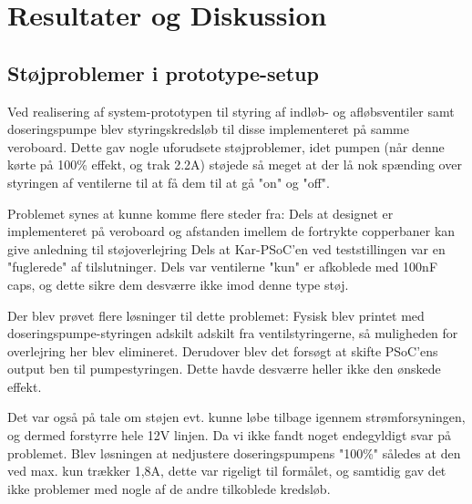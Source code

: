 \section{Resultater og Diskussion}

\subsection{Støjproblemer i prototype-setup}

Ved realisering af system-prototypen til styring af indløb- og afløbsventiler samt doseringspumpe blev styringskredsløb til disse implementeret på samme veroboard. 
Dette gav nogle uforudsete støjproblemer, idet pumpen (når denne kørte på 100\% effekt, og trak 2.2A) støjede så meget at der lå nok spænding over styringen af ventilerne til at få dem til at gå "on" og "off".\newline

Problemet synes at kunne komme flere steder fra: 
Dels at designet er implementeret på veroboard og afstanden imellem de fortrykte copperbaner kan give anledning til støjoverlejring
Dels at Kar-PSoC'en ved teststillingen var en "fuglerede" af tilslutninger. 
Dels var ventilerne "kun" er afkoblede med 100nF caps, og dette sikre dem desværre ikke imod denne type støj.\newline

Der blev prøvet flere løsninger til dette problemet: 
Fysisk blev printet med doseringspumpe-styringen adskilt adskilt fra ventilstyringerne, så muligheden for overlejring her blev elimineret. 
Derudover blev det forsøgt at skifte PSoC'ens output ben til pumpestyringen. Dette havde desværre heller ikke den ønskede effekt. \newline

Det var også på tale om støjen evt. kunne løbe tilbage igennem strømforsyningen, og dermed forstyrre hele 12V linjen. 
Da vi ikke fandt noget endegyldigt svar på problemet. Blev løsningen at nedjustere doseringspumpens "100\%" således at den ved max. kun trækker 1,8A, dette var rigeligt til formålet, og samtidig gav det ikke problemer med nogle af de andre tilkoblede kredsløb.
\newline